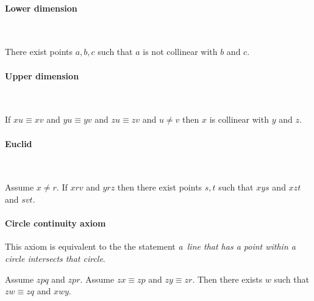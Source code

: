 \documentclass[10pt,a4paper,parskip=half,numbers=endperiod,headings=standardclasses,parskip]{scrbook}
\newcommand{\Cong}[4]{#1 #2 \equiv #3 #4}
\newcommand{\Betw}[3]{#1 #2 #3}
\begin{document}
  \paragraph{Lower dimension}\

  \begin{forthel}
    \begin{axiom}[A8]
      There exist points $a,b,c$ such that
      $a$ is not collinear with $b$ and $c$.
    \end{axiom}
  \end{forthel}


  \paragraph{Upper dimension}\

  \begin{forthel}
    \begin{axiom}[A9]
      If $\Cong{x}{u}{x}{v}$ and $\Cong{y}{u}{y}{v}$
      and $\Cong{z}{u}{z}{v}$ and $u \neq v$
      then $x$ is collinear with $y$ and $z$.
    \end{axiom}
  \end{forthel}


  \paragraph{Euclid}\

  \begin{forthel}
    \begin{axiom}[A10]
      Assume $x \neq r$.
      If $\Betw{x}{r}{v}$ and $\Betw{y}{r}{z}$
      then there exist points $s,t$ such that
      $\Betw{x}{y}{s}$ and $\Betw{x}{z}{t}$ and $\Betw{s}{v}{t}$.
    \end{axiom}
  \end{forthel}


  \paragraph{Circle continuity axiom}
  This axiom is equivalent to the the statement
  \textit{a~line that has a point within a circle intersects that circle}.

  \begin{forthel}
    \begin{axiom}[CA]
      Assume $\Betw{z}{p}{q}$ and $\Betw{z}{p}{r}$.
      Assume $\Cong{z}{x}{z}{p}$ and $\Cong{z}{y}{z}{r}$.
      Then there exists $w$ such that $\Cong{z}{w}{z}{q}$ and $\Betw{x}{w}{y}$.
    \end{axiom}
  \end{forthel}
\end{document}
